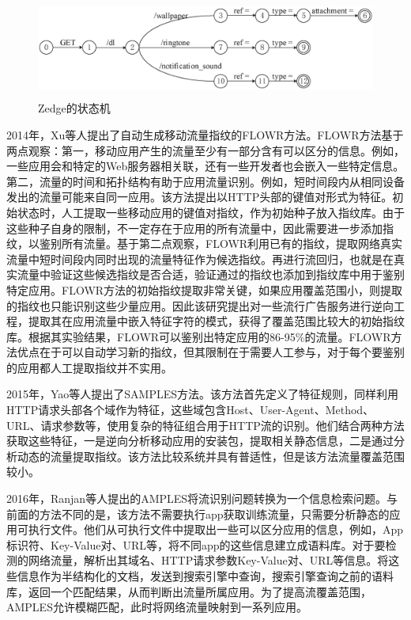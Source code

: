\begin{figure}[thb]
\centering
\includegraphics[height=1.3in]{./figures/2/2-3}
\caption{Zedge的状态机}
\label{fig:23}
\end{figure}

2014年，Xu等人提出了自动生成移动流量指纹的FLOWR方法\supercite{xu2014flowr,xu2015automatic}。FLOWR方法基于两点观察：第一，移动应用产生的流量至少有一部分含有可以区分的信息。例如，一些应用会和特定的Web服务器相关联，还有一些开发者也会嵌入一些特定信息。第二，流量的时间和拓扑结构有助于应用流量识别。例如，短时间段内从相同设备发出的流量可能来自同一应用。该方法提出以HTTP头部的键值对形式为特征。初始状态时，人工提取一些移动应用的键值对指纹，作为初始种子放入指纹库。由于这些种子自身的限制，不一定存在于应用的所有流量中，因此需要进一步添加指纹，以鉴别所有流量。基于第二点观察，FLOWR利用已有的指纹，提取网络真实流量中短时间段内同时出现的流量特征作为候选指纹。再进行流回归，也就是在真实流量中验证这些候选指纹是否合适，验证通过的指纹也添加到指纹库中用于鉴别特定应用。FLOWR方法的初始指纹提取非常关键，如果应用覆盖范围小，则提取的指纹也只能识别这些少量应用。因此该研究提出对一些流行广告服务进行逆向工程，提取其在应用流量中嵌入特征字符的模式，获得了覆盖范围比较大的初始指纹库。根据其实验结果，FLOWR可以鉴别出特定应用的86-95\%的流量。FLOWR方法优点在于可以自动学习新的指纹，但其限制在于需要人工参与，对于每个要鉴别的应用都人工提取指纹并不实用。

2015年，Yao等人提出了SAMPLES方法\supercite{yao2015samples}。该方法首先定义了特征规则，同样利用HTTP请求头部各个域作为特征，这些域包含Host、User-Agent、Method、URL、请求参数等，使用复杂的特征组合用于HTTP流的识别。他们结合两种方法获取这些特征，一是逆向分析移动应用的安装包，提取相关静态信息，二是通过分析动态的流量提取指纹。该方法比较系统并具有普适性，但是该方法流量覆盖范围较小。

2016年，Ranjan等人提出的AMPLES将流识别问题转换为一个信息检索问题\supercite{ranjan2016approximate}。与前面的方法不同的是，该方法不需要执行app获取训练流量，只需要分析静态的应用可执行文件。他们从可执行文件中提取出一些可以区分应用的信息，例如，App标识符、Key-Value对、URL等，将不同app的这些信息建立成语料库。对于要检测的网络流量，解析出其域名、HTTP请求参数Key-Value对、URL等信息。将这些信息作为半结构化的文档，发送到搜索引擎中查询，搜索引擎查询之前的语料库，返回一个匹配结果，从而判断出流量所属应用。为了提高流覆盖范围，AMPLES允许模糊匹配，此时将网络流量映射到一系列应用。

